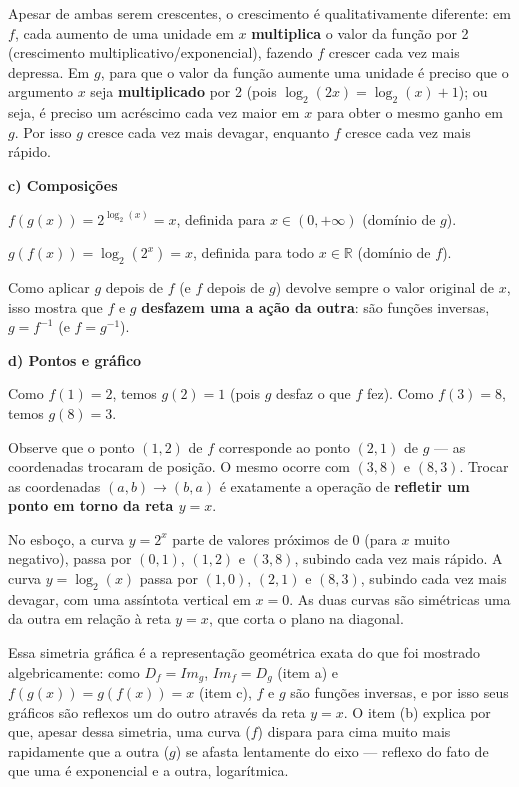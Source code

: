 \documentclass[11pt,a4paper]{article}
\begin{document}
Apesar de ambas serem crescentes, o crescimento é qualitativamente diferente: em $f$, cada aumento de uma unidade em $x$ \textbf{multiplica} o valor da função por 2 (crescimento multiplicativo/exponencial), fazendo $f$ crescer cada vez mais depressa. Em $g$, para que o valor da função aumente uma unidade é preciso que o argumento $x$ seja \textbf{multiplicado} por 2 (pois $\log_2(2x) = \log_2(x)+1$); ou seja, é preciso um acréscimo cada vez maior em $x$ para obter o mesmo ganho em $g$. Por isso $g$ cresce cada vez mais devagar, enquanto $f$ cresce cada vez mais rápido.

\textbf{c) Composições}

$f(g(x)) = 2^{\log_2(x)} = x$, definida para $x \in (0,+\infty)$ (domínio de $g$).

$g(f(x)) = \log_2(2^{x}) = x$, definida para todo $x \in \mathbb{R}$ (domínio de $f$).

Como aplicar $g$ depois de $f$ (e $f$ depois de $g$) devolve sempre o valor original de $x$, isso mostra que $f$ e $g$ \textbf{desfazem uma a ação da outra}: são funções inversas, $g = f^{-1}$ (e $f = g^{-1}$).

\textbf{d) Pontos e gráfico}

Como $f(1)=2$, temos $g(2) = 1$ (pois $g$ desfaz o que $f$ fez). Como $f(3)=8$, temos $g(8) = 3$.

Observe que o ponto $(1,2)$ de $f$ corresponde ao ponto $(2,1)$ de $g$ — as coordenadas trocaram de posição. O mesmo ocorre com $(3,8)$ e $(8,3)$. Trocar as coordenadas $(a,b) \to (b,a)$ é exatamente a operação de \textbf{refletir um ponto em torno da reta $y=x$}.

No esboço, a curva $y = 2^x$ parte de valores próximos de $0$ (para $x$ muito negativo), passa por $(0,1)$, $(1,2)$ e $(3,8)$, subindo cada vez mais rápido. A curva $y=\log_2(x)$ passa por $(1,0)$, $(2,1)$ e $(8,3)$, subindo cada vez mais devagar, com uma assíntota vertical em $x=0$. As duas curvas são simétricas uma da outra em relação à reta $y=x$, que corta o plano na diagonal.

Essa simetria gráfica é a representação geométrica exata do que foi mostrado algebricamente: como $D_f = Im_g$, $Im_f = D_g$ (item a) e $f(g(x))=g(f(x))=x$ (item c), $f$ e $g$ são funções inversas, e por isso seus gráficos são reflexos um do outro através da reta $y=x$. O item (b) explica por que, apesar dessa simetria, uma curva ($f$) dispara para cima muito mais rapidamente que a outra ($g$) se afasta lentamente do eixo — reflexo do fato de que uma é exponencial e a outra, logarítmica.
\end{document}
